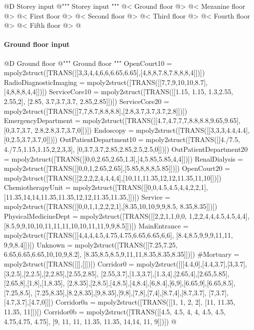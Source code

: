 \documentclass[11pt,oneside]{article}    %
\begin{document}
@D Storey input
@{""" Storey input """
@< Ground floor @>
@< Mezanine floor @>
@< First floor @>
@< Second floor @>
@< Third floor @>
@< Fourth floor @>
@< Fifth floor @>
@}


\paragraph{Ground floor input}
@D Ground floor 
@{""" Ground floor """
OpenCourt10 = mpoly2struct([TRANS([[3,3,4,4,6,6,6.65,6.65],[4,8,8,7.8,7.8,8,8,4]])])
RadioDiagnosticImaging = mpoly2struct([TRANS([[7,7,9,10,10,8.7],[4,8,8,8,4,4]])])
ServiceCore10 = mpoly2struct([TRANS([[1.15, 1.15, 1.3,2.55, 2.55,2], [2.85, 3.7,3.7,3.7, 2.85,2.85]])])
ServiceCore20 = mpoly2struct([TRANS([[7,7,8.7,8.8,8.8],[2.8,3.7,3.7,3.7,2.8]])])
EmergencyDepartment = mpoly2struct([TRANS([[4.7,4.7,7,7,8.8,8.8,9.65,9.65],[0,3.7,3.7, 2.8,2.8,3.7,3.7,0]])])
Endoscopy = mpoly2struct([TRANS([[3,3,3,4.4,4.4],[0,2.5,3.7,3.7,0]])])
OutPatientDepartment10 = mpoly2struct([TRANS([[4./7.5, 4./7.5,1.15,1.15,2,2,3,3], [0,3.7,3.7,2.85,2.85,2.5,2.5,0]])])
OutPatientDepartment20 = mpoly2struct([TRANS([[0,0,2.65,2.65,1.3],[4,5.85,5.85,4,4]])])
RenalDialysis = mpoly2struct([TRANS([[0,0,1,2.65,2.65],[5.85,8,8,8,5.85]])])
OpenCourt20 = mpoly2struct([TRANS([[2,2,2,2,4,4,4,4],[10,11,11.35,12,12,11.35,11,10]])])
ChemiotherapyUnit = mpoly2struct([TRANS([[0,0,4.5,4.5,4,4,2,2,1], [11.35,14,14,11.35,11.35,12,12,11.35,11.35,]])])
Service = mpoly2struct([TRANS([[0,0,1,1,2,2,2,1],[8.35,10,10,9,9,8.5, 8.35,8.35]])])
PhysicalMedicineDept = mpoly2struct([TRANS([[2,2,1,1,0,0, 1,2,2,4,4,4.5,4.5,4,4], [8.5,9,9,10,10,11,11,11,10,10,11,11,9,9,8.5]])])
MainEntrance = mpoly2struct([TRANS([[4,4,4,4.5,4.75,4.75,6.65,6.65,6,6], [8.4,8.5,9,9,9,11,11, 9,9,8.4]])])
Unknown = mpoly2struct([TRANS([[7.25,7.25, 6.65,6.65,6.65,10,10,9,8.2], [8.35,8.5,8.5,9,11,11,8.35,8.35,8.35]])])
#Mortuary = mpoly2struct([TRANS([[],[]])])
Corridor0 = mpoly2struct([[[4.4,0],[4.4,3.7],[3,3.7],[3,2.5],[2,2.5],[2,2.85],[2.55,2.85], [2.55,3.7],[1.3,3.7],[1.3,4],[2.65,4],[2.65,5.85],[2.65,8],[1,8],[1,8.35], [2,8.35],[2,8.5],[4,8.5],[4,8.4],[6,8.4],[6,9],[6.65,9],[6.65,8.5],[7.25,8.5], [7.25,8.35],[8.2,8.35],[9,8.35],[9,8],[7,8],[7,4],[8.7,4],[8.7,3.7], [7,3.7],[4.7,3.7],[4.7,0]]])
Corridor0a = mpoly2struct([TRANS([[1, 1, 2, 2], [11, 11.35, 11.35, 11]])])
Corridor0b = mpoly2struct([TRANS([[4.5, 4.5, 4, 4, 4.5, 4.5, 4.75,4.75, 4.75], [9, 11, 11, 11.35, 11.35, 14,14, 11, 9]])])
@}
\end{document}
